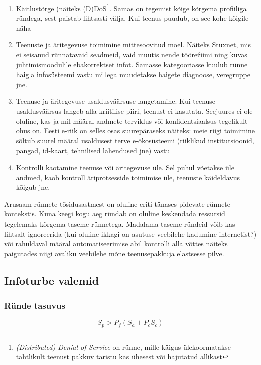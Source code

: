 \documentclass{article}
\begin{document}
\begin{enumerate}
	\item Käitlustõrge (näiteks (D)DoS\footnote{\emph{(Distributed) Denial of Service} on rünne, mille käigus ülekoormatakse tahtlikult teenust pakkuv taristu kas ühesest või hajutatud allikast}. Samas on tegemist kõige kõrgema profiiliga ründega, sest paistab lihtsasti välja. Kui teenus puudub, on see kohe kõigile näha
	\item Teenuste ja äritegevuse toimimine mittesoovitud moel. Näiteks Stuxnet, mis ei seisanud rünnatavaid seadmeid, vaid muutis nende tööre\v{z}iimi ning kuvas juhtimismoodulile ebakorrektset infot. Samasse kategooriasse kuulub rünne haigla infosüsteemi vastu millega muudetakse haigete diagnoose, veregruppe jne. 
	\item Teenuse ja äritegevuse usaldusväärsuse langetamine. Kui teenuse usaldusväärsus langeb alla kriitilise piiri, teenust ei kasutata. Seejuures ei ole oluline, kas ja mil määral andmete terviklus või konfidentsiaalsus tegelikult ohus on. Eesti e-riik on selles osas suurepäraseks näiteks: meie riigi toimimine sõltub suurel määral usaldusest terve e-ökosüsteemi (riiklikud institutsioonid, pangad, id-kaart, tehnilised lahendused jne) vastu 
	\item Kontrolli kaotamine teenuse või äritegevuse üle. Sel puhul võetakse üle andmed, kaob kontroll äriprotsesside toimimise üle, teenuste käideldavus kõigub jne.
\end{enumerate}

Arusaam rünnete tõsidusastmest on oluline eriti tänases pidevate rünnete kontekstis. Kuna keegi kogu aeg ründab on oluline keskendada ressursid tegelemaks kõrgema taseme rünnetega. Madalama taseme ründeid võib kas lihtsalt ignoreerida (kui oluline ikkagi on asutuse veebilehe kadumine internetist?) või rahuldaval määral automatiseerimise abil kontrolli alla võttes näiteks paigutades niigi avaliku veebilehe mõne teenusepakkuja elastsesse pilve.

\subsection{Infoturbe valemid} 
\label{sec:valemid}
\subsubsection{Ründe tasuvus}
\begin{equation}
		S_p>P_f(S_a + P_c S_c)
		\label{eq:tasuvus}
\end{equation}
\end{document}
